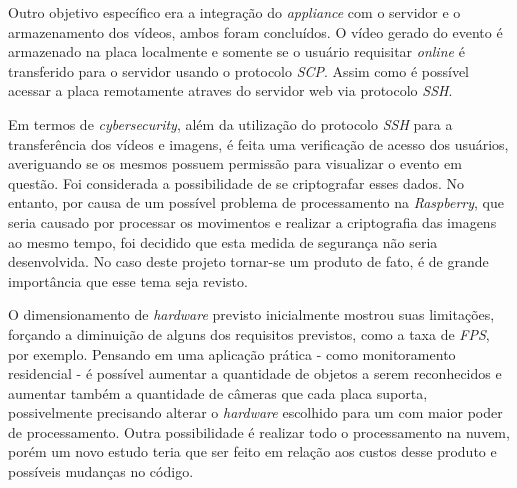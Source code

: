 Outro objetivo específico era a integração do \textit{appliance} com o servidor e o armazenamento dos vídeos, ambos foram concluídos. O vídeo gerado do evento é armazenado na placa localmente e somente se o usuário requisitar \textit{online} é transferido para o servidor usando o protocolo \textit{SCP}. Assim como é possível acessar a placa remotamente atraves do servidor web via protocolo \textit{SSH}.

Em termos de \textit{cybersecurity}, além da utilização do protocolo \textit{SSH} para a transferência dos vídeos e imagens, é feita uma verificação de acesso dos usuários, averiguando se os mesmos possuem permissão para visualizar o evento em questão. Foi considerada a possibilidade de se criptografar esses dados. No entanto, por causa de um possível problema de processamento na \textit{Raspberry}, que seria causado por processar os movimentos e realizar a criptografia das imagens ao mesmo tempo, foi decidido que esta medida de segurança não seria desenvolvida. No caso deste projeto tornar-se um produto de fato, é de grande importância que esse tema seja revisto.

O dimensionamento de \textit{hardware} previsto inicialmente mostrou suas limitações, forçando a diminuição de alguns dos requisitos previstos, como a taxa de \textit{FPS}, por exemplo. Pensando em uma aplicação prática - como monitoramento residencial - é possível aumentar a quantidade de objetos a serem reconhecidos e aumentar também a quantidade de câmeras que cada placa suporta, possivelmente precisando alterar o \textit{hardware} escolhido para um com maior poder de processamento. Outra possibilidade é realizar todo o processamento na nuvem, porém um novo estudo teria que ser feito em relação aos custos desse produto e possíveis mudanças no código.